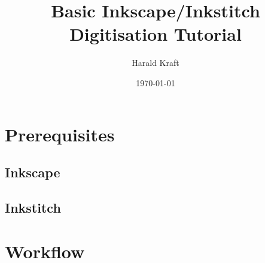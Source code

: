 \documentclass{article}
\title{Basic Inkscape/Inkstitch Digitisation Tutorial}
\author{Harald Kraft}
\date{\today}
\begin{document}
    \maketitle

    \tableofcontents

    \pagebreak

    \section{Prerequisites}
        \subsection{Inkscape}

        \subsection{Inkstitch}
    
        \pagebreak
    \section{Workflow}
\end{document}
